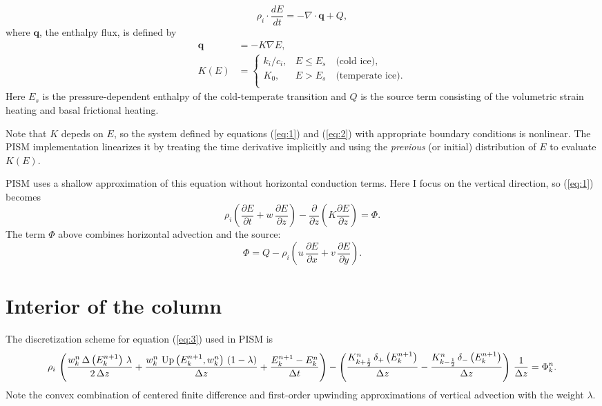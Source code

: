 \documentclass{article}
\newcommand{\diff}[2]{\frac{\partial #1}{\partial #2}}
\begin{document}
\begin{equation}
  \label{eq:1}
  \rho_{i} \cdot \frac{dE}{dt} = -\nabla\cdot\mathbf{q} + Q,
\end{equation}
where
$\mathbf{q}$, the enthalpy flux, is defined by
\begin{align}
  \label{eq:2}
  \mathbf{q} &= -K \nabla E,\\
  K(E) &=
  \begin{cases}
    k_{i}/c_{i}, & E \le E_{s}\quad\text{(cold ice)},\\
    K_{0}, & E > E_{s}\quad\text{(temperate ice)}.\\
  \end{cases}
\end{align}
Here $E_{s}$ is the pressure-dependent enthalpy of the cold-temperate
transition and $Q$ is the source term consisting of the volumetric
strain heating and basal frictional heating.

Note that $K$ depeds on $E$, so the system defined by equations
(\ref{eq:1}) and (\ref{eq:2}) with appropriate boundary conditions is
nonlinear. The PISM implementation linearizes it by treating the time
derivative implicitly and using the \emph{previous} (or
initial) distribution of $E$ to evaluate $K(E)$.

PISM uses a shallow approximation of this equation without horizontal
conduction terms. Here I focus on the vertical direction, so
(\ref{eq:1}) becomes
\begin{equation}
  \label{eq:3}
  \rho_{i} \left( \diff{E}{t} + w\,\diff{E}{z} \right) - \diff{}{z}\left( K \diff{E}{z} \right) = \Phi.
\end{equation}
The term $\Phi$ above combines horizontal advection and the source:
\begin{equation}
  \label{eq:4}
    \Phi = Q - \rho_{i} \left( u\,\diff{E}{x} + v\,\diff{E}{y} \right).
\end{equation}

\section{Interior of the column}
\label{sec:interior}

The discretization scheme for equation (\ref{eq:3}) used in PISM is
\begin{equation}
  \label{eq:5}
  \rho_{i}\,\left(\frac{w^{n}_{k}\,\Delta\left(E^{n+1}_{k}\right)\,\lambda}{2\,\Delta z}+\frac{w^{n}_{k}\,\operatorname{Up}\left(E^{n+1}_{k} , w^{n}_{k}\right)\,\left(1-\lambda\right)}{\Delta z}+\frac{E^{n+1}_{k}-E^{n}_{k}}{\Delta t}\right)-\left(\frac{K^{n}_{k+\frac{1}{2}}\,\mathbf{\delta}_{+}\left(E^{n+1}_{k}\right)}{\Delta z}-\frac{K^{n}_{k-\frac{1}{2}}\,\mathbf{\delta}_{-}\left(E^{n+1}_{k}\right)}{\Delta z}\right)\,\frac{1}{\Delta z}=\Phi^{n}_{k}.
\end{equation}
Note the convex combination of centered finite difference and
first-order upwinding approximations of vertical advection with the
weight $\lambda$.
\end{document}
